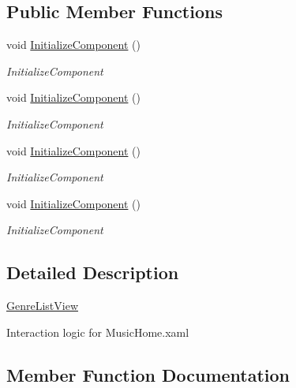 \subsection*{Public Member Functions}
\begin{DoxyCompactItemize}
\item 
void \hyperlink{class_presentation_1_1_view_1_1_list_1_1_genre_list_view_a5f6099fc62c1c6be505c094bacca79ca}{Initialize\+Component} ()
\begin{DoxyCompactList}\small\item\em Initialize\+Component \end{DoxyCompactList}\item 
void \hyperlink{class_presentation_1_1_view_1_1_list_1_1_genre_list_view_a5f6099fc62c1c6be505c094bacca79ca}{Initialize\+Component} ()
\begin{DoxyCompactList}\small\item\em Initialize\+Component \end{DoxyCompactList}\item 
void \hyperlink{class_presentation_1_1_view_1_1_list_1_1_genre_list_view_a5f6099fc62c1c6be505c094bacca79ca}{Initialize\+Component} ()
\begin{DoxyCompactList}\small\item\em Initialize\+Component \end{DoxyCompactList}\item 
void \hyperlink{class_presentation_1_1_view_1_1_list_1_1_genre_list_view_a5f6099fc62c1c6be505c094bacca79ca}{Initialize\+Component} ()
\begin{DoxyCompactList}\small\item\em Initialize\+Component \end{DoxyCompactList}\end{DoxyCompactItemize}


\subsection{Detailed Description}
\hyperlink{class_presentation_1_1_view_1_1_list_1_1_genre_list_view}{Genre\+List\+View} 

Interaction logic for Music\+Home.\+xaml 

\subsection{Member Function Documentation}
\mbox{\label{class_presentation_1_1_view_1_1_list_1_1_genre_list_view_a5f6099fc62c1c6be505c094bacca79ca}} 
